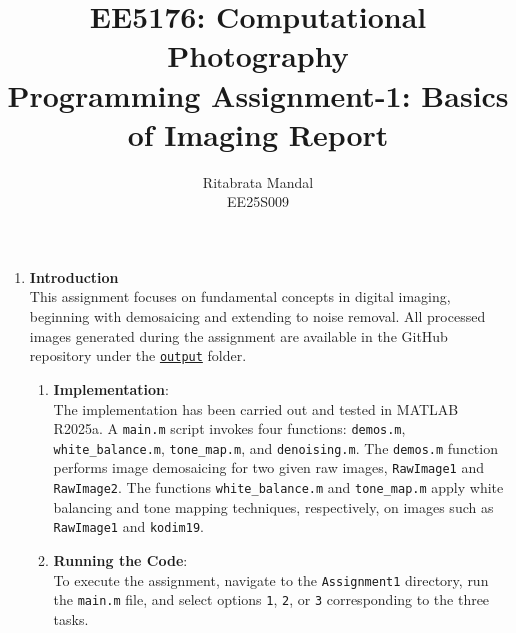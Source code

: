 \documentclass[11pt, a4]{article}
\begin{document}
	\pagestyle{fancy}
	\fancyhead{}\fancyfoot{}
	\author{Ritabrata Mandal\\ EE25S009}
	\title{EE5176: Computational Photography\\Programming Assignment-1: Basics of Imaging Report}
	\maketitle
	
	\medskip
	\newpage
	\begin{enumerate}
		\item \textbf{Introduction}\\
		This assignment focuses on fundamental concepts in digital imaging, beginning with demosaicing and extending to noise removal. 
		All processed images generated during the assignment are available in the GitHub repository under the 
		\href{URL}{\texttt{output}} folder.  
		
		\begin{enumerate}
			\item \textbf{Implementation}:\\
			The implementation has been carried out and tested in MATLAB R2025a. 
			A \texttt{main.m} script invokes four functions: \texttt{demos.m}, \texttt{white\_balance.m}, 
			\texttt{tone\_map.m}, and \texttt{denoising.m}. 
			The \texttt{demos.m} function performs image demosaicing for two given raw images, \texttt{RawImage1} and \texttt{RawImage2}. 
			The functions \texttt{white\_balance.m} and \texttt{tone\_map.m} apply white balancing and tone mapping techniques, respectively, 
			on images such as \texttt{RawImage1} and \texttt{kodim19}. 
			
			\item \textbf{Running the Code}:\\
			To execute the assignment, navigate to the \texttt{Assignment1} directory, run the \texttt{main.m} file, 
			and select options \texttt{1}, \texttt{2}, or \texttt{3} corresponding to the three tasks.
		\end{enumerate}
		

\end{enumerate}
\end{document}

